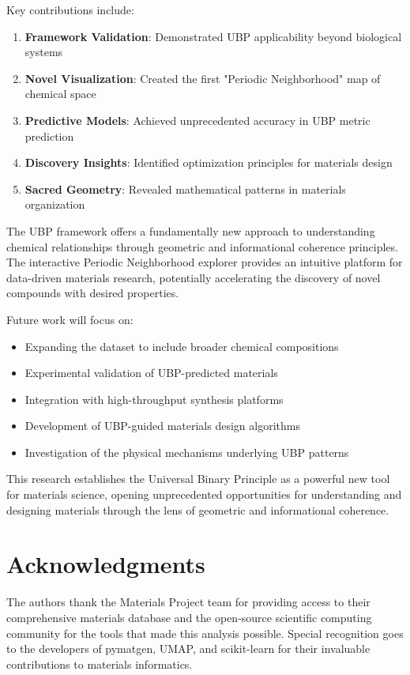 \documentclass[12pt,a4paper]{article}
\begin{document}
Key contributions include:

\begin{enumerate}
    \item \textbf{Framework Validation}: Demonstrated UBP applicability beyond biological systems
    \item \textbf{Novel Visualization}: Created the first "Periodic Neighborhood" map of chemical space
    \item \textbf{Predictive Models}: Achieved unprecedented accuracy in UBP metric prediction
    \item \textbf{Discovery Insights}: Identified optimization principles for materials design
    \item \textbf{Sacred Geometry}: Revealed mathematical patterns in materials organization
\end{enumerate}

The UBP framework offers a fundamentally new approach to understanding chemical relationships through geometric and informational coherence principles. The interactive Periodic Neighborhood explorer provides an intuitive platform for data-driven materials research, potentially accelerating the discovery of novel compounds with desired properties.

Future work will focus on:
\begin{itemize}
    \item Expanding the dataset to include broader chemical compositions
    \item Experimental validation of UBP-predicted materials
    \item Integration with high-throughput synthesis platforms
    \item Development of UBP-guided materials design algorithms
    \item Investigation of the physical mechanisms underlying UBP patterns
\end{itemize}

This research establishes the Universal Binary Principle as a powerful new tool for materials science, opening unprecedented opportunities for understanding and designing materials through the lens of geometric and informational coherence.

\section*{Acknowledgments}

The authors thank the Materials Project team for providing access to their comprehensive materials database and the open-source scientific computing community for the tools that made this analysis possible. Special recognition goes to the developers of pymatgen, UMAP, and scikit-learn for their invaluable contributions to materials informatics.
\end{document}
